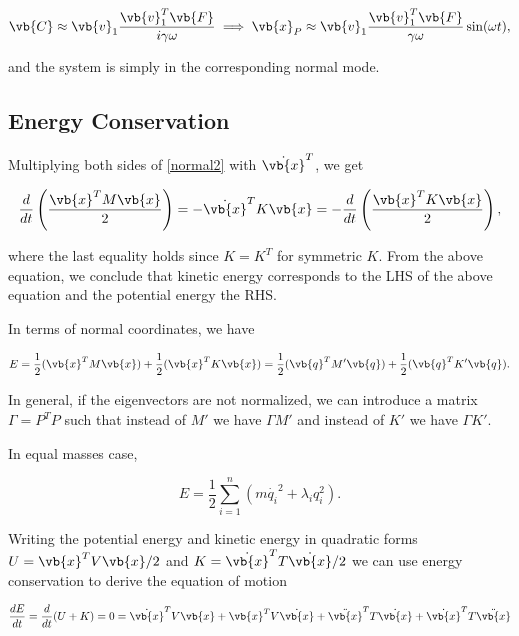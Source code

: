 \documentclass[a4paper,12pt]{report}
\begin{document}
\begin{equation}
    \vb{C} \approx \vb{v} _{1} \frac{\vb{v} _{1} ^T \vb{F} }{i \gamma \omega }  \implies \vb{x} _{P} \approx \vb{v} _{1} \frac{\vb{v} _{1} ^T \vb{F}  }{\gamma \omega }\sin (\omega t),
\end{equation}

and the system is simply in the corresponding normal mode.

\subsection{Energy Conservation}

Multiplying both sides of \cref{normal2} with \(\dot{\vb{x} }^T \), we get

\begin{equation}
    \frac{d}{dt} \left(\frac{\vb{x} ^TM\vb{x} }{2}\right) = - \dot{\vb{x} }^TK\vb{x} = -\frac{d}{dt} \left( \frac{\vb{x}^T K \vb{x} }{2}  \right),  
\end{equation}

where the last equality holds since \(K=K^T\) for symmetric \(K\). From the above equation, we conclude that kinetic energy corresponds to the LHS of the above equation and the potential energy the RHS.

In terms of normal coordinates, we have

\begin{equation}
    E = \frac{1}{2} (\vb{x} ^TM\vb{x}) + \frac{1}{2} (\vb{x} ^TK\vb{x}) =  \frac{1}{2}(\vb{q} ^TM'\vb{q} )+\frac{1}{2}(\vb{q} ^TK'\vb{q} ).
\end{equation}

In general, if the eigenvectors are not normalized, we can introduce a matrix \(\Gamma = P^TP\) such that instead of \(M'\) we have \(\Gamma M'\) and instead of \(K'\) we have \(\Gamma K'\).     

In equal masses case, 

\begin{equation}
    E = \frac{1}{2} \sum_{i=1}^{n} \left(  m \dot{q_{i} }^2+\lambda _{i}q_{i}^2     \right).
\end{equation}

Writing the potential energy and kinetic energy in quadratic forms \(U = \vb{x} ^T V \vb{x} /2\) and \(K = \dot{\vb{x} }  ^T T \dot{\vb{x} }  /2\) we can use energy conservation to derive the equation of motion

\begin{equation}
	\frac{dE}{dt} = \frac{d}{dt}(U+K) = 0 = \dot{\vb{x} }^TV \vb{x} + \vb{x} ^T V \dot{\vb{x} } + \ddot{\vb{x} }^T T \dot{\vb{x} }  + \dot{\vb{x} }  ^T T \ddot{\vb{x} }    
\end{equation}
\end{document}
